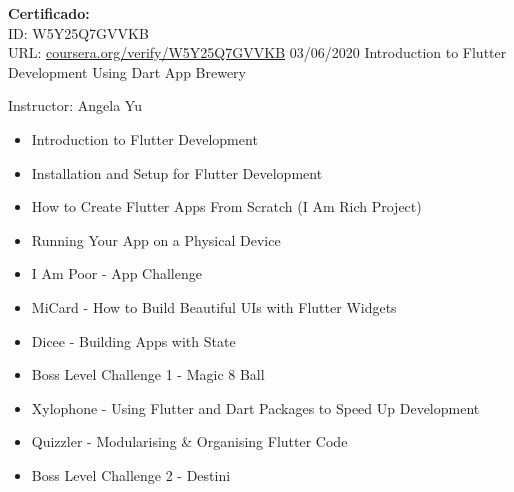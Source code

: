 \begin{entrylist}
{            \textbf{Certificado:} \\
            ID: W5Y25Q7GVVKB \\
            URL: {\href{https://coursera.org/verify/W5Y25Q7GVVKB}{coursera.org/verify/W5Y25Q7GVVKB}}
		}
    \entry
		{03/06/2020}
		{Introduction to Flutter Development Using Dart}
		{App Brewery}
		{
		    Instructor: Angela Yu \\
		    \vspace{-5mm}
    	    \begin{itemize}
    	        \setlength\itemsep{0pt}
    	        \setlength\parskip{0pt}
    	        \item Introduction to Flutter Development
    	        \item Installation and Setup for Flutter Development
    	        \item How to Create Flutter Apps From Scratch (I Am Rich Project)
    	        \item Running Your App on a Physical Device
    	        \item I Am Poor - App Challenge
    	        \item MiCard - How to Build Beautiful UIs with Flutter Widgets
    	        \item Dicee - Building Apps with State
    	        \item Boss Level Challenge 1 - Magic 8 Ball
    	        \item Xylophone - Using Flutter and Dart Packages to Speed Up Development
    	        \item Quizzler - Modularising \& Organising Flutter Code
    	        \item Boss Level Challenge 2 - Destini
            \end{itemize}
            
}
\end{entrylist}
